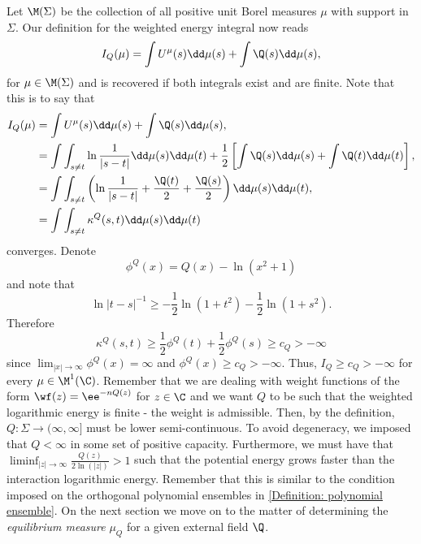 Let $\M(\Sigma)$ be the collection of all positive unit Borel measures $\mu$ with support in $\Sigma$. Our definition for the weighted energy integral now reads
\begin{equation}
	I_Q(\mu) = \int U^\mu(s)  \dd \mu(s) + \int \Q(s) \dd  \mu(s),
\end{equation}
for $\mu \in \M(\Sigma)$ and is recovered if both integrals exist and are finite. Note that this is to say that
\begin{align}
	I_Q(\mu) & = \int U^\mu(s)  \dd \mu(s) + \int \Q(s) \dd  \mu(s), \\
	& = \int \int_{s \neq t} \ln \frac{1}{|s-t|} \dd \mu(s) \dd \mu (t) + \frac{1}{2} \left[ \int \Q(s) \dd  \mu(s) + \int \Q(t) \dd  \mu(t)  \right], \\
	& =   \int \int_{s \neq t} \left( \ln \frac{1}{|s-t|} + \frac{\Q(t)}{2} + \frac{\Q(s)}{2} \right) \dd \mu(s) \dd \mu (t), \\
	& = \int \int_{s \neq t} \kappa^Q(s,t) \dd \mu(s) \dd \mu (t)
\end{align}
converges. Denote
\begin{equation}
	\phi^Q(x) = Q(x) - \ln(x^2 + 1)
\end{equation}
and note that
\begin{equation}
	\ln |t - s|^{-1} \geq - \frac{1}{2} \ln(1+t^2) - \frac{1}{2} \ln(1+s^2).
\end{equation}
Therefore
\begin{equation}
	\kappa^Q(s,t) \geq \frac{1}{2}\phi^Q(t) + \frac{1}{2}\phi^Q(s)\geq c_Q > -\infty
\end{equation}
since $\lim_{|x|\rightarrow \infty}\phi^Q(x) = \infty$ and $\phi^Q(x) \geq c_Q > -\infty$. Thus, $I_Q \geq c_Q > -\infty$ for every $\mu \in \M^1(\C)$. Remember that we are dealing with weight functions of the form
$
	\wf(z) = \ee^{-nQ(z)}
$
for $z \in \C$ and we want $Q$ to be such that the weighted logarithmic energy is finite - the weight is admissible. Then, by the definition, $Q : \Sigma \rightarrow (\infty, \infty]$ must be lower semi-continuous. To avoid degeneracy, we imposed that $Q < \infty$ in some set of positive capacity. Furthermore, we must have that $\liminf_{|z| \rightarrow \infty } \frac{Q(z)}{2 \ln{(|z|)}} > 1$ such that the potential energy grows faster than the interaction logarithmic energy. Remember that this is similar to the condition imposed on the orthogonal polynomial ensembles in \autoref{Definition: polynomial ensemble}. On the next section we move on to the matter of determining the \textit{equilibrium measure} $\mu_Q$ for a given external field $\Q$.


